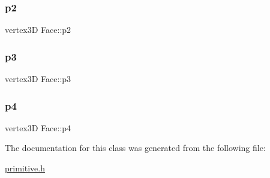 \mbox{\label{class_face_aa7c7c6a437774d7ff2c95fdc96ad7840}} 
\subsubsection{\texorpdfstring{p2}{p2}}
{\footnotesize\ttfamily vertex3D Face\+::p2}

\mbox{\label{class_face_a83603534660d5aea15b287d83b0aa2d8}} 
\subsubsection{\texorpdfstring{p3}{p3}}
{\footnotesize\ttfamily vertex3D Face\+::p3}

\mbox{\label{class_face_a0691e5c72ca6be50acb683e12ce1482f}} 
\subsubsection{\texorpdfstring{p4}{p4}}
{\footnotesize\ttfamily vertex3D Face\+::p4}



The documentation for this class was generated from the following file\+:\begin{DoxyCompactItemize}
\item 
\mbox{\hyperlink{primitive_8h}{primitive.\+h}}\end{DoxyCompactItemize}
